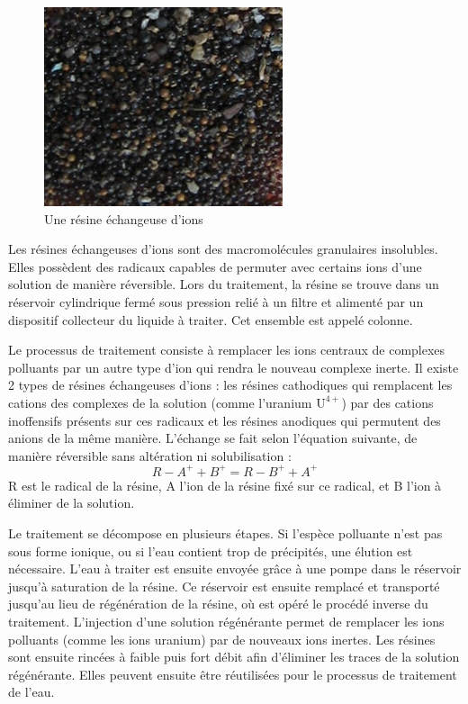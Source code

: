 \documentclass{article}
\begin{document}
\begin{figure}[H]
\centering
\includegraphics[]{III_A_2.png}
\caption{Une résine échangeuse d'ions}
\label{fig:resine_echangeuse_ions}
\end{figure}

Les résines échangeuses d’ions sont des macromolécules granulaires insolubles. Elles possèdent des radicaux capables de permuter avec certains ions d’une solution de manière réversible. Lors du traitement, la résine se trouve dans un réservoir cylindrique fermé sous pression relié à un filtre et alimenté par un dispositif collecteur du liquide à traiter. Cet ensemble est appelé colonne.

Le processus de traitement consiste à remplacer les ions centraux de complexes polluants par un autre type d’ion qui rendra le nouveau complexe inerte. Il existe 2 types de résines échangeuses d’ions : les résines cathodiques qui remplacent les cations des complexes de la solution (comme l’uranium $\text{U}^{4+}$) par des cations inoffensifs présents sur ces radicaux et les résines anodiques qui permutent des anions de la même manière.
L’échange se fait selon l’équation suivante, de manière réversible sans altération ni solubilisation :
$$R-A^+ + B^+ = R-B^+ + A^+$$
R est le radical de la résine, A l’ion de la résine fixé sur ce radical, et B l’ion à éliminer de la solution.

Le traitement se décompose en plusieurs étapes. Si l’espèce polluante n’est pas sous forme ionique, ou si l’eau contient trop de précipités, une élution est nécessaire. L’eau à traiter est ensuite envoyée grâce à une pompe dans le réservoir jusqu’à saturation de la résine. Ce réservoir est ensuite remplacé et transporté jusqu’au lieu de régénération de la résine, où est opéré le procédé inverse du traitement. L’injection d’une solution régénérante permet de remplacer les ions polluants (comme les ions uranium) par de nouveaux ions inertes. Les résines sont ensuite rincées à faible puis fort débit afin d’éliminer les traces de la solution régénérante. Elles peuvent ensuite être réutilisées pour le processus de traitement de l’eau.
\end{document}
